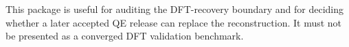 This package is useful for auditing the DFT-recovery boundary and for deciding whether a later accepted QE release can replace the reconstruction. It must not be presented as a converged DFT validation benchmark.
